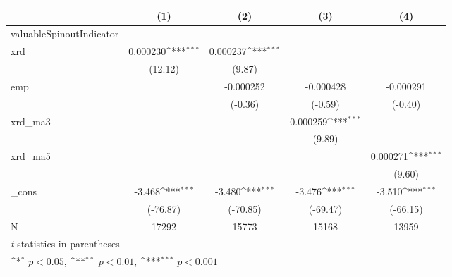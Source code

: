 {
\def\sym#1{\ifmmode^{#1}\else\(^{#1}\)\fi}
\begin{tabular}{l*{4}{c}}
\hline\hline
            &\multicolumn{1}{c}{(1)}         &\multicolumn{1}{c}{(2)}         &\multicolumn{1}{c}{(3)}         &\multicolumn{1}{c}{(4)}         \\
\hline
valuableSpinoutIndicator&                     &                     &                     &                     \\
xrd         &    0.000230\sym{***}&    0.000237\sym{***}&                     &                     \\
            &     (12.12)         &      (9.87)         &                     &                     \\
[1em]
emp         &                     &   -0.000252         &   -0.000428         &   -0.000291         \\
            &                     &     (-0.36)         &     (-0.59)         &     (-0.40)         \\
[1em]
xrd\_ma3     &                     &                     &    0.000259\sym{***}&                     \\
            &                     &                     &      (9.89)         &                     \\
[1em]
xrd\_ma5     &                     &                     &                     &    0.000271\sym{***}\\
            &                     &                     &                     &      (9.60)         \\
[1em]
\_cons      &      -3.468\sym{***}&      -3.480\sym{***}&      -3.476\sym{***}&      -3.510\sym{***}\\
            &    (-76.87)         &    (-70.85)         &    (-69.47)         &    (-66.15)         \\
\hline
N           &       17292         &       15773         &       15168         &       13959         \\
\hline\hline
\multicolumn{5}{l}{\footnotesize \textit{t} statistics in parentheses}\\
\multicolumn{5}{l}{\footnotesize \sym{*} \(p<0.05\), \sym{**} \(p<0.01\), \sym{***} \(p<0.001\)}\\
\end{tabular}
}
